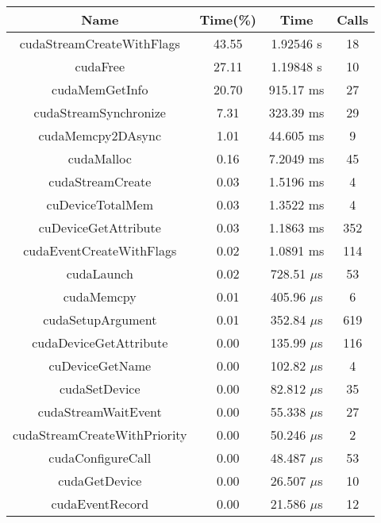\documentclass[12pt,titlepage]{article}
\begin{document}
\begin{table}[h!]
	\centering
	\begin{tabular}{||c | c | c | c||}
		\hline
		Name                             & Time(\%) & Time          & Calls \\ [0.5ex]
		\hline\hline
		cudaStreamCreateWithFlags        & 43.55    & 1.92546 s     & 18    \\
		cudaFree                         & 27.11    & 1.19848 s     & 10    \\
		cudaMemGetInfo                   & 20.70    & 915.17 ms     & 27    \\
		cudaStreamSynchronize            & 7.31     & 323.39 ms     & 29    \\
		cudaMemcpy2DAsync                & 1.01     & 44.605 ms     & 9     \\
		cudaMalloc                       & 0.16     & 7.2049 ms     & 45    \\
		cudaStreamCreate                 & 0.03     & 1.5196 ms     & 4     \\
		cuDeviceTotalMem                 & 0.03     & 1.3522 ms     & 4     \\
		cuDeviceGetAttribute             & 0.03     & 1.1863 ms     & 352   \\
		cudaEventCreateWithFlags         & 0.02     & 1.0891 ms     & 114   \\
		cudaLaunch                       & 0.02     & 728.51 $\mu$s & 53    \\
		cudaMemcpy                       & 0.01     & 405.96 $\mu$s & 6     \\
		cudaSetupArgument                & 0.01     & 352.84 $\mu$s & 619   \\
		cudaDeviceGetAttribute           & 0.00     & 135.99 $\mu$s & 116   \\
		cuDeviceGetName                  & 0.00     & 102.82 $\mu$s & 4     \\
		cudaSetDevice                    & 0.00     & 82.812 $\mu$s & 35    \\
		cudaStreamWaitEvent              & 0.00     & 55.338 $\mu$s & 27    \\
		cudaStreamCreateWithPriority     & 0.00     & 50.246 $\mu$s & 2     \\
		cudaConfigureCall                & 0.00     & 48.487 $\mu$s & 53    \\
		cudaGetDevice                    & 0.00     & 26.507 $\mu$s & 10    \\
		cudaEventRecord                  & 0.00     & 21.586 $\mu$s & 12    \\

\end{tabular}
\end{table}
\end{document}
